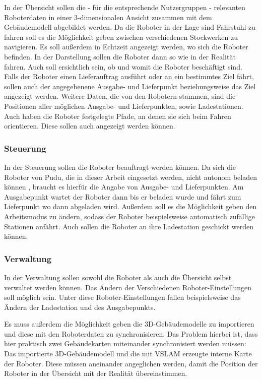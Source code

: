 In der Übersicht sollen die - für die entsprechende Nutzergruppen - relevanten Roboterdaten in einer 3-dimensionalen Ansicht zusammen mit dem Gebäudemodell abgebildet werden. Da die Roboter in der Lage sind Fahrstuhl zu fahren soll es die Möglichkeit geben zwischen verschiedenen Stockwerken zu navigieren. Es soll außerdem in Echtzeit angezeigt werden, wo sich die Roboter befinden. In der Darstellung sollen die Roboter dann so wie in der Realität fahren. Auch soll ersichtlich sein, ob und womit die Roboter beschäftigt sind. Falls der Roboter einen Lieferauftrag ausführt oder an ein bestimmtes Ziel fährt, sollen auch der angegebenene Ausgabe- und Lieferpunkt beziehungsweise das Ziel angezeigt werden. Weitere Daten, die von den Robotern stammen, sind die Positionen aller möglichen Ausgabe- und Lieferpunkten, sowie Ladestationen. Auch haben die Roboter festgelegte Pfade, an denen sie sich beim Fahren  orientieren. Diese sollen auch angezeigt werden können.

\subsubsection{Steuerung}

In der Steuerung sollen die Roboter beauftragt werden können. Da sich die Roboter von Pudu, die in dieser Arbeit eingesetzt werden, nicht autonom beladen können \cite{KettyBot2024}, braucht es hierfür die Angabe von Ausgabe- und Lieferpunkten. Am Ausgabepunkt wartet der Roboter dann bis er beladen wurde und fährt zum Lieferpunkt wo dann abgeladen wird. Außerdem soll es die Möglichkeit geben den Arbeitsmodus zu ändern, sodass der Roboter beispielsweise automatisch zufällige Stationen anfährt. Auch sollen die Roboter an ihre Ladestation geschickt werden können.

\subsubsection{Verwaltung}

In der Verwaltung sollen sowohl die Roboter als auch die Übersicht selbst verwaltet werden können. Das Ändern der Verschiedenen Roboter-Einstellungen soll möglich sein. Unter diese Roboter-Einstellungen fallen beispielsweise das Ändern der Ladestation und des Ausgabepunkts.

Es muss außerdem die Möglichkeit geben die 3D-Gebäudemodelle zu importieren und diese mit den Roboterdaten zu synchronisieren. Das Problem hierbei ist, dass hier praktisch zwei Gebäudekarten miteinander synchronisiert werden müssen: Das importierte 3D-Gebäudemodell und die mit \ac{VSLAM} erzeugte interne Karte der Roboter. Diese müssen aneinander angeglichen werden, damit die Position der Roboter in der Übersicht mit der Realität übereinstimmen.

